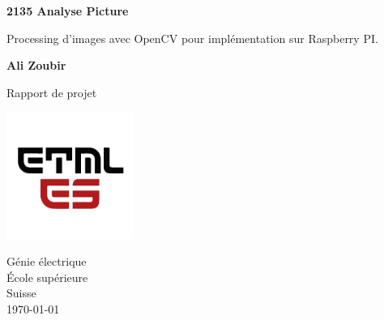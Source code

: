 \begin{titlepage}
   \begin{center}
        \vspace*{1cm}
        \LARGE
        {\Huge \textbf{2135 Analyse Picture}}
        
        \vspace{0.3cm}
        Processing d'images avec OpenCV pour implémentation sur Raspberry PI.
            
        \vspace{1.5cm}

        \textbf{Ali Zoubir}

        \vfill
            
        Rapport de projet
            
        \vspace{0.8cm}
     
        \includegraphics[width=0.31\textwidth]{ETML-ES-LOGO.png}

        Génie électrique\\
        École supérieure\\
        Suisse\\
        \monthyeardate\today
            
   \end{center}
\end{titlepage}